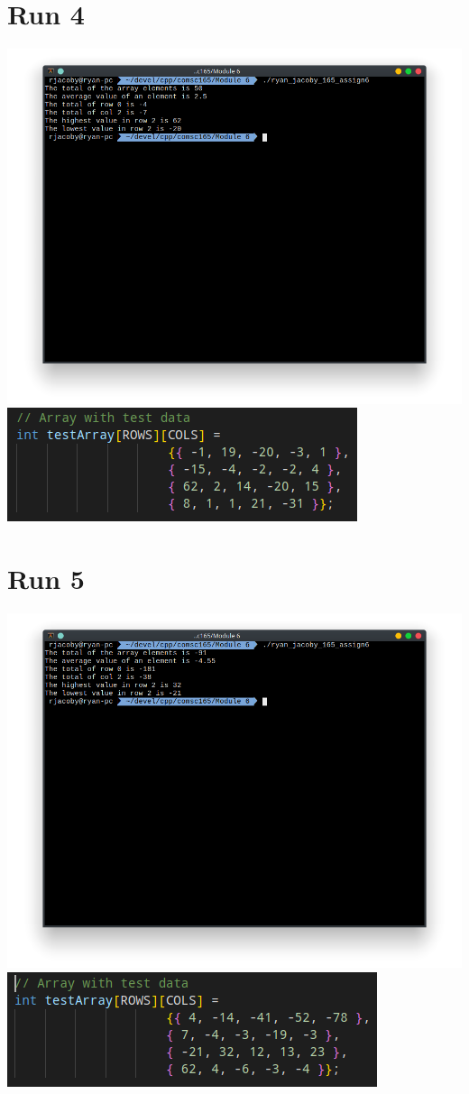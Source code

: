\documentclass[letterpaper, 11pt]{article}
\begin{document}
\section*{Run 4}
\includegraphics[scale=0.5]{run4_1.png} \\
\includegraphics[scale=0.5]{run4_2.png}

\section*{Run 5}
\includegraphics[scale=0.5]{run5_1.png} \\
\includegraphics[scale=0.5]{run5_2.png}
\end{document}
